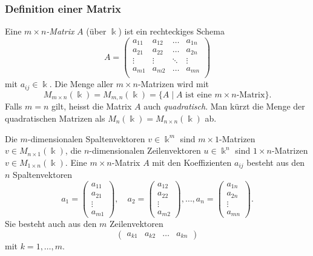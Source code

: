 \subsubsection{Definition einer Matrix}
\begin{definition}
Eine {\em $m\times n$-Matrix} $A$ (über $\Bbbk$) ist ein rechteckiges Schema
%
\[
A
=
\begin{pmatrix}
a_{11}&a_{12}&\dots &a_{1n}\\
a_{21}&a_{22}&\dots &a_{2n}\\
\vdots&\vdots&\ddots&\vdots\\
a_{m1}&a_{m2}&\dots &a_{mn}\\
\end{pmatrix}
\]
mit $a_{i\!j}\in\Bbbk$.
Die Menge aller $m\times n$-Matrizen wird mit
\[
M_{m\times n}(\Bbbk)
=
M_{m,n}(\Bbbk)
=
\{ A \mid \text{$A$ ist eine $m\times n$-Matrix}\}.
\]
Falls $m=n$ gilt, heisst die Matrix $A$ auch {\em quadratisch}.
%
Man kürzt die Menge der quadratischen Matrizen als
$M_n(\Bbbk) = M_{n\times n}(\Bbbk)$ ab.
\end{definition}

Die $m$-dimensionalen Spaltenvektoren $v\in \Bbbk^m$ sind $m\times 1$-Matrizen
$v\in M_{n\times 1}(\Bbbk)$, die $n$-dimensionalen Zeilenvektoren $u\in\Bbbk^n$
sind $1\times n$-Matrizen $v\in M_{1\times n}(\Bbbk)$.
Eine $m\times n$-Matrix $A$ mit den Koeffizienten $a_{i\!j}$ besteht aus
den $n$ Spaltenvektoren
\[
a_1 = \begin{pmatrix} a_{11} \\ a_{21} \\ \vdots \\ a_{m1} \end{pmatrix},\quad
a_2 = \begin{pmatrix} a_{12} \\ a_{22} \\ \vdots \\ a_{m2} \end{pmatrix},\dots,
a_n = \begin{pmatrix} a_{1n} \\ a_{2n} \\ \vdots \\ a_{mn} \end{pmatrix}.
\]
Sie besteht auch aus den $m$ Zeilenvektoren
\[
\begin{pmatrix} a_{k1} & a_{k2} & \dots & a_{kn} \end{pmatrix}
\]
mit $k=1,\dots,m$.

